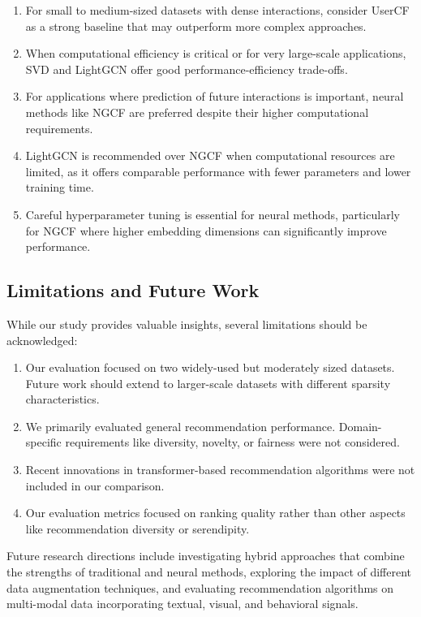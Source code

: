 \documentclass[sigconf,nonacm]{acmart} %
\begin{document}
\begin{enumerate}  
    \item For small to medium-sized datasets with dense interactions, consider UserCF as a strong baseline that may outperform more complex approaches.  
    
    \item When computational efficiency is critical or for very large-scale applications, SVD and LightGCN offer good performance-efficiency trade-offs.  
    
    \item For applications where prediction of future interactions is important, neural methods like NGCF are preferred despite their higher computational requirements.  
    
    \item LightGCN is recommended over NGCF when computational resources are limited, as it offers comparable performance with fewer parameters and lower training time.  
    
    \item Careful hyperparameter tuning is essential for neural methods, particularly for NGCF where higher embedding dimensions can significantly improve performance.  
\end{enumerate}  

\subsection{Limitations and Future Work}  

While our study provides valuable insights, several limitations should be acknowledged:  

\begin{enumerate}  
    \item Our evaluation focused on two widely-used but moderately sized datasets. Future work should extend to larger-scale datasets with different sparsity characteristics.  
    
    \item We primarily evaluated general recommendation performance. Domain-specific requirements like diversity, novelty, or fairness were not considered.  
    
    \item Recent innovations in transformer-based recommendation algorithms were not included in our comparison.  
    
    \item Our evaluation metrics focused on ranking quality rather than other aspects like recommendation diversity or serendipity.  
\end{enumerate}  

Future research directions include investigating hybrid approaches that combine the strengths of traditional and neural methods, exploring the impact of different data augmentation techniques, and evaluating recommendation algorithms on multi-modal data incorporating textual, visual, and behavioral signals.  

  
   
  
\end{document}
